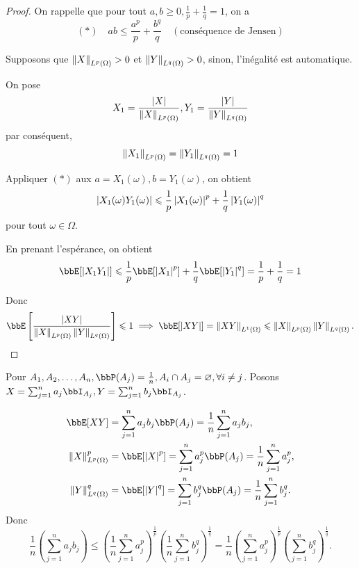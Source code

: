 \begin{proof}
    On rappelle que pour tout $a, b \geqslant 0, \frac{1}{p} + \frac{1}{q} = 1$, on a
    \[ (*) \quad ab \leqslant \frac{a^p}{p} + \frac{b^q}{q} \quad (\text{conséquence de Jensen}) \]

    Supposons que $\left\lVert X \right\rVert_{L^p(\Omega)} > 0$ et $\left\lVert Y \right\rVert_{L^q(\Omega)} > 0$,
    sinon, l'inégalité est automatique.

    On pose
    \[ X_1 = \frac{\left\lvert X \right\rvert}{\left\lVert X \right\rVert_{L^p(\Omega)}}, Y_1 = \frac{\left\lvert Y \right\rvert}{\left\lVert Y \right\rVert_{L^q(\Omega)}} \]
    par conséquent,
    \[ \left\lVert X_1 \right\rVert_{L^p(\Omega)} = \left\lVert Y_1 \right\rVert_{L^q(\Omega)} = 1 \]

    Appliquer $(*)$ aux $a = X_1(\omega), b = Y_1(\omega)$, on obtient
    \[ \left\lvert X_1(\omega)Y_1(\omega) \right\rvert \leqslant \frac{1}{p} \left\lvert X_1(\omega) \right\rvert^p + \frac{1}{q} \left\lvert Y_1(\omega) \right\rvert^q \]
    pour tout $\omega \in \Omega$.

    En prenant l'espérance, on obtient
    \[ \bbE[\lrvert{X_1Y_1}] \leqslant \frac{1}{p} \bbE[\lrvert{X_1}^p] + \frac{1}{q} \bbE[\lrvert{Y_1}^q]
        = \frac{1}{p} + \frac{1}{q} = 1 \]

    Donc
    \[ \bbE \left[\frac{\lrvert{XY}}{\lrVert{X}_{L^p(\Omega)} \lrVert{Y}_{L^q(\Omega)}}\right] \leqslant 1
        \implies \bbE[\lrvert{XY}] = \lrVert{XY}_{L^1(\Omega)} \leqslant \lrVert{X}_{L^p(\Omega)} \lrVert{Y}_{L^q(\Omega)}. \]
\end{proof}

\begin{rqq}
    Pour $A_1, A_2, \ldots, A_n, \bbP(A_j) = \frac{1}{n}, A_i \cap A_j = \varnothing, \forall i \neq j$.
    Posons $X = \sum_{j = 1}^n a_j \bbI_{A_j}, Y = \sum_{j = 1}^n b_j \bbI_{A_j}$.

    \begin{align*}
        \bbE[XY]                   & = \sum_{j = 1}^n a_jb_j \bbP(A_j) = \frac{1}{n} \sum_{j = 1}^n a_jb_j,                    \\
        \lrVert{X}_{L^p(\Omega)}^p & = \bbE[\lrvert{X}^p] = \sum_{j = 1}^n a_j^p \bbP(A_j) = \frac{1}{n} \sum_{j = 1}^n a_j^p, \\
        \lrVert{Y}_{L^q(\Omega)}^q & = \bbE[\lrvert{Y}^q] = \sum_{j = 1}^n b_j^q \bbP(A_j) = \frac{1}{n} \sum_{j = 1}^n b_j^q.
    \end{align*}
    Donc
    \[ \frac{1}{n} \left(\sum_{j = 1}^n a_jb_j\right) \leqslant
        \left(\frac{1}{n}\sum_{j = 1}^n a_j^p\right)^{\frac{1}{p}} \left(\frac{1}{n}\sum_{j = 1}^n b_j^q\right)^{\frac{1}{q}}
        = \frac{1}{n} \left(\sum_{j = 1}^n a_j^p\right)^{\frac{1}{p}} \left(\sum_{j = 1}^n b_j^q\right)^{\frac{1}{q}}. \]
\end{rqq}


